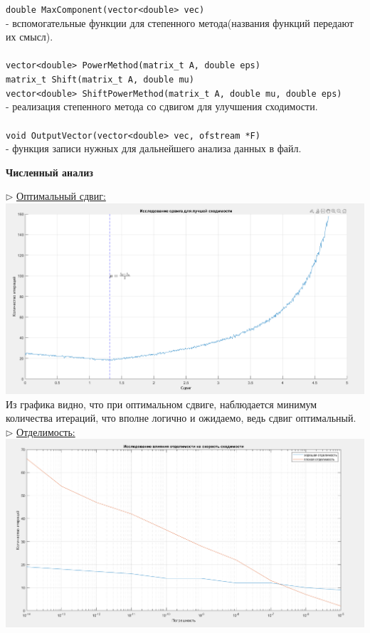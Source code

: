 \documentclass{article}
\begin{document}
	\verb|double MaxComponent(vector<double> vec)|\\
	- вспомогательные функции для степенного метода(названия функций передают их смысл).\\
	\\
	\verb|vector<double> PowerMethod(matrix_t A, double eps)|\\
	\verb|matrix_t Shift(matrix_t A, double mu)|\\
	\verb|vector<double> ShiftPowerMethod(matrix_t A, double mu, double eps)|\\
	- реализация степенного метода со сдвигом для улучшения сходимости.\\
	\\
	\verb|void OutputVector(vector<double> vec, ofstream *F)|\\
	- функция записи нужных для дальнейшего анализа данных в файл.
	\begin{center} \textbf{Численный анализ}\end{center}
	$\triangleright$ \underline{Оптимальный сдвиг:}\\
	\includegraphics[scale = 0.4]{Сдвиг}\\
	Из графика видно, что при оптимальном сдвиге, наблюдается минимум количества итераций, что вполне логично и ожидаемо, ведь сдвиг оптимальный.\\
	\newpage
	$\triangleright$ \underline{Отделимость:}\\
	\includegraphics[scale = 0.4]{Отделимость}\\
\end{document}
